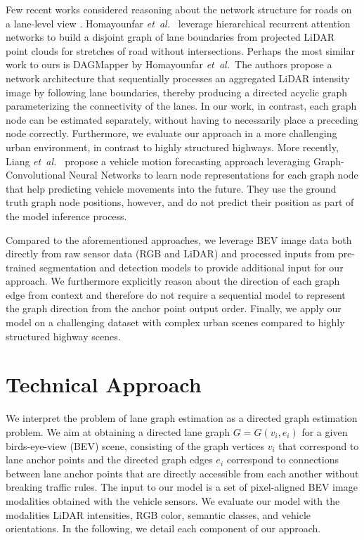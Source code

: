 \documentclass[letterpaper, 10 pt, conference]{ieeeconf}
\newcommand{\etal}{\emph{et~al.~}}
\begin{document}
Few recent works considered reasoning about the network structure for roads on a lane-level view \cite{homayounfar2018hierarchical, homayounfar2019dagmapper, sela20203d, liang2020learning}. Homayounfar \etal \cite{homayounfar2018hierarchical} leverage hierarchical recurrent attention networks to build a disjoint graph of lane boundaries from projected LiDAR point clouds for stretches of road without intersections.
Perhaps the most similar work to ours is DAGMapper \cite{homayounfar2019dagmapper} by Homayounfar \etal The authors propose a network architecture that sequentially processes an aggregated LiDAR intensity image by following lane boundaries, thereby producing a directed acyclic graph parameterizing the connectivity of the lanes. In our work, in contrast, each graph node can be estimated separately, without having to necessarily place a preceding node correctly. Furthermore, we evaluate our approach in a more challenging urban environment, in contrast to highly structured highways. More recently, Liang \etal \cite{liang2020learning} propose a vehicle motion forecasting approach leveraging Graph-Convolutional Neural Networks to learn node representations for each graph node that help predicting vehicle movements into the future. They use the ground truth graph node positions, however, and do not predict their position as part of the model inference process.


Compared to the aforementioned approaches, we leverage BEV image data both directly from raw sensor data (RGB and LiDAR) and processed inputs from pre-trained segmentation and detection models to provide additional input for our approach. We furthermore explicitly reason about the direction of each graph edge from context and therefore do not require a sequential model  to represent the graph direction from the anchor point output order. Finally, we apply our model on a challenging dataset with complex urban scenes compared to highly structured highway scenes.

 
\section{Technical Approach}
\label{sec:approach}


We interpret the problem of lane graph estimation as a directed graph estimation problem. We aim at obtaining a directed lane graph $G = G(v_i,e_i)$ for a given birds-eye-view (BEV) scene, consisting of the graph vertices $v_i$ that correspond to lane anchor points and the directed graph edges $e_i$ correspond to connections between lane anchor points that are directly accessible from each another without breaking traffic rules. The input to our model is a set of pixel-aligned BEV image modalities obtained with the vehicle sensors. We evaluate our model with the modalities LiDAR intensities, RGB color, semantic classes, and vehicle orientations. In the following, we detail each component of our approach.
\end{document}
